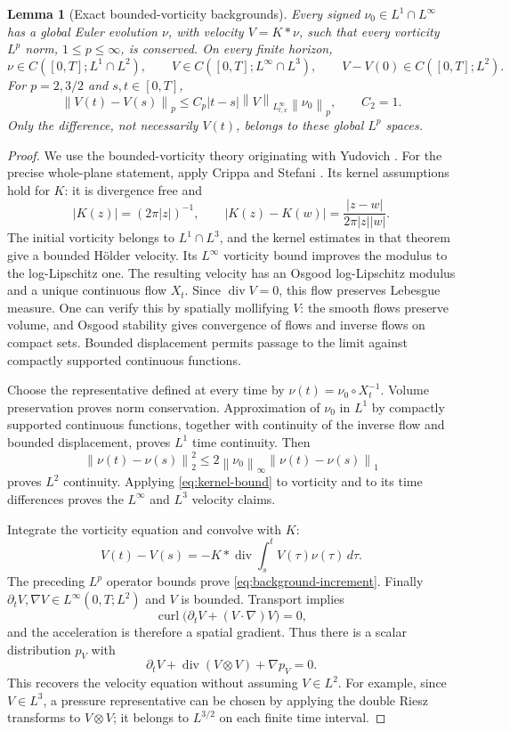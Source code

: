 \documentclass[11pt,a4paper,reqno]{amsart}
\theoremstyle{plain}
\newtheorem{lemma}[theorem]{Lemma}
\theoremstyle{definition}
\theoremstyle{remark}
\numberwithin{equation}{section}
\newcommand{\curl}{\operatorname{curl}}
\newcommand{\Div}{\operatorname{div}}
\newcommand{\norm}[2]{\left\|#1\right\|_{#2}}
\begin{document}
\begin{lemma}[Exact bounded-vorticity backgrounds]\label{lem:background}
Every signed $\nu_0\in L^1\cap L^\infty$ has a global Euler evolution
$\nu$, with velocity $V=K*\nu$, such that every vorticity
$L^p$ norm, $1\le p\le\infty$, is conserved. On every finite horizon,
\[
 \nu\in C([0,T];L^1\cap L^2),\qquad
 V\in C([0,T];L^\infty\cap L^3),
 \qquad V-V(0)\in C([0,T];L^2).
\]
For $p=2,3/2$ and $s,t\in[0,T]$,
\begin{equation}\label{eq:background-increment}
 \norm{V(t)-V(s)}p
 \le C_p|t-s|\norm V{L^\infty_{t,x}}\norm{\nu_0}p,
 \qquad C_2=1.
\end{equation}
Only the difference, not necessarily $V(t)$, belongs to these global
$L^p$ spaces.
\end{lemma}
\begin{proof}
We use the bounded-vorticity theory originating with Yudovich
\cite{Yudovich}. For the precise whole-plane statement, apply
Crippa and Stefani \cite[Theorem~3.3 and Definition~3.2]{CS}.
Its kernel assumptions hold for $K$: it is divergence free and
\[
 |K(z)|=(2\pi|z|)^{-1},\qquad
 |K(z)-K(w)|=\frac{|z-w|}{2\pi|z||w|}.
\]
The initial vorticity belongs to $L^1\cap L^3$, and the kernel
estimates in that theorem give a bounded H\"older velocity. Its
$L^\infty$ vorticity bound improves the modulus to the
log-Lipschitz one. The resulting velocity has an Osgood
log-Lipschitz modulus and a unique continuous flow $X_t$.
Since $\Div V=0$, this flow preserves Lebesgue measure. One can verify
this by spatially mollifying $V$: the smooth flows preserve volume,
and Osgood stability gives convergence of flows and inverse flows on
compact sets. Bounded displacement permits passage to the limit against
compactly supported continuous functions.

Choose the representative defined at every time by
$\nu(t)=\nu_0\circ X_t^{-1}$. Volume preservation proves norm
conservation. Approximation of $\nu_0$ in $L^1$ by compactly supported
continuous functions, together with continuity of the inverse flow and
bounded displacement, proves $L^1$ time continuity. Then
\[
 \norm{\nu(t)-\nu(s)}2^2
 \le2\norm{\nu_0}\infty\norm{\nu(t)-\nu(s)}1
\]
proves $L^2$ continuity. Applying \eqref{eq:kernel-bound} to vorticity
and to its time differences proves the $L^\infty$ and $L^3$ velocity
claims.

Integrate the vorticity equation and convolve with $K$:
\[
 V(t)-V(s)=-K*\Div\int_s^t V(\tau)\nu(\tau)\,d\tau.
\]
The preceding $L^p$ operator bounds prove
\eqref{eq:background-increment}. Finally
$\partial_tV,\nabla V\in L^\infty(0,T;L^2)$ and $V$ is bounded.
Transport implies
\[
 \curl\bigl(\partial_tV+(V\cdot\nabla)V\bigr)=0,
\]
and the acceleration is therefore a spatial gradient. Thus there is
a scalar distribution $p_V$ with
\[
 \partial_tV+\Div(V\otimes V)+\nabla p_V=0.
\]
This recovers the velocity equation without assuming $V\in L^2$.
For example, since $V\in L^3$, a pressure representative can be
chosen by applying the double Riesz transforms to $V\otimes V$;
it belongs to $L^{3/2}$ on each finite time interval.
\end{proof}
\end{document}
